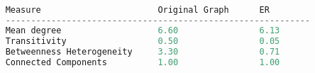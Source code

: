 \documentclass{hw}
\begin{document}
\pagebreak




\begin{lstlisting}[language=Python]

    Measure                       Original Graph      ER                  
    ------------------------------------------------------------
    Mean degree                   6.60                6.13                
    Transitivity                  0.50                0.05                
    Betweenness Heterogeneity     3.30                0.71                
    Connected Components          1.00                1.00 
\end{lstlisting}
\end{document}
